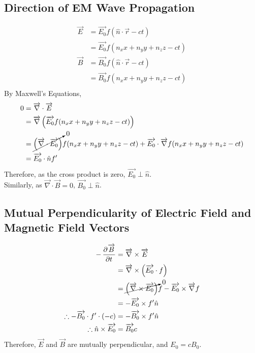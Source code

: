 \documentclass[fleqn, a4paper, 12pt, twoside]{article}
\theoremstyle{definition}
\theoremstyle{theorem}
\begin{document}
\subsection{Direction of EM Wave Propagation}

\begin{align*}
	\overrightarrow{E} &= \overrightarrow{E_0} f\left( \hat{n} \cdot \overrightarrow{r} - c t \right)\\
	&= \overrightarrow{E_0} f(n_x x + n_y y + n_z z - c t)\\
	\overrightarrow{B} &= \overrightarrow{B_0} f\left( \hat{n} \cdot \overrightarrow{r} - c t \right)\\
	&= \overrightarrow{B_0} f(n_x x + n_y y + n_z z - c t)\\
\end{align*}
By Maxwell's Equations,
\begin{align*}
	0 &=\overrightarrow{\nabla} \cdot \overrightarrow{E}\\
	&= \overrightarrow{\nabla} \left( \overrightarrow{E_0} f(n_x x + n_y y + n_z z - c t) \right)\\
	&= \cancelto{0}{\left( \overrightarrow{\nabla} \cdot \overrightarrow{E_0} \right)} f(n_x x + n_y y + n_z z - c t) + \overrightarrow{E_0} \cdot \overrightarrow{\nabla} f(n_x x + n_y y + n_z z - c t)\\
	&= \overrightarrow{E_0} \cdot \hat{n} f'
\end{align*}
Therefore, as the cross product is zero, $\overrightarrow{E_0} \perp \hat{n}$.\\
Similarly, as $\overrightarrow{\nabla} \cdot \overrightarrow{B} = 0$, $\overrightarrow{B_0} \perp \hat{n}$.

\subsection{Mutual Perpendicularity of Electric Field and Magnetic Field Vectors}

\begin{align*}
	-\dpd{\overrightarrow{B}}{t} &= \overrightarrow{\nabla} \times \overrightarrow{E}\\
	&= \overrightarrow{\nabla} \times \left( \overrightarrow{E_0} \cdot f \right)\\
	&= \cancelto{0}{\left( \overrightarrow{\nabla} \times \overrightarrow{E_0} \right)} f - \overrightarrow{E_0} \times \overrightarrow{\nabla} f\\
	&= -\overrightarrow{E_0} \times f' \hat{n}\\
	\therefore -\overrightarrow{B_0} \cdot f' \cdot (-c) &= -\overrightarrow{B_0} \times f' \hat{n}\\
	\therefore \hat{n} \times \overrightarrow{E_0} &= \overrightarrow{B_0} c
\end{align*}
Therefore, $\overrightarrow{E}$ and $\overrightarrow{B}$ are mutually perpendicular, and $E_0 = c B_0$.
\end{document}
